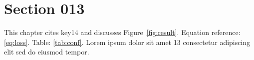 \section{Section 013}\label{sec:s13}
This chapter cites key14 and discusses Figure~\ref{fig:result}.
Equation reference: \eqref{eq:loss}. Table: \ref{tab:conf}.
Lorem ipsum dolor sit amet 13 consectetur adipiscing elit sed do eiusmod tempor.
